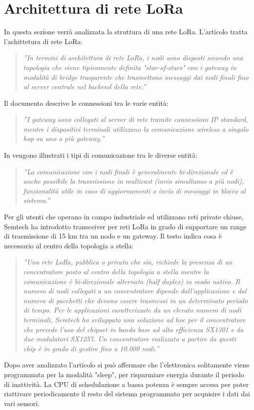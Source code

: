 \documentclass[a4paper]{report} %
\begin{document}
\section{Architettura di rete LoRa}
In questa sezione verrà analizzata la struttura di una rete LoRa. L'articolo \cite{art:rif.27} tratta l'achittetura di rete LoRa:
\begin{quote}
	\textit{''In termini di architettura di rete LoRa, i nodi sono disposti secondo una topologia che viene tipicamente definita "star-of-stars" con i gateway in modalità di bridge trasparente che trasmettono messaggi dai nodi finali fino al server centrale nel backend della rete.''}
\end{quote}
Il documento \cite{art:rif.28} descrive le connessioni tra le varie entità:
\begin{quote}
	\textit{''I gateway sono collegati al server di rete tramite connessioni IP standard, mentre i dispositivi terminali utilizzano la comunicazione wireless a singolo hop su uno o più gateway.''} 
\end{quote}
In \cite{art:rif.27} vengono illustrati i tipi di comunicazione tra le diverse entità: 
\begin{quote}
	\textit{''La comunicazione con i nodi finali è generalmente bi-direzionale ed è anche possibile la trasmissione in multicast (invio simultaneo a più nodi), funzionalità utile in caso di aggiornamenti o invio di messaggi in blocco al sistema.''} 
\end{quote}
Per gli utenti che operano in campo industriale ed utilizzano reti private chiuse, Semtech ha introdotto transceiver per reti LoRa in grado di supportare un range di trasmissione di 15 km tra un nodo e un gateway. Il testo \cite{art:rif.23} indica cosa è necessario al centro della topologia a stella:
\begin{quote}
	\textit{''Una rete LoRa, pubblica o privata che sia, richiede la presenza di un concentratore posto al centro della topologia a stella mentre la comunicazione è bi-direzionale alternata (half duplex) in modo nativo. Il numero di nodi collegati a un concentratore dipende dall'applicazione e dal numero di pacchetti che devono essere trasmessi in un determinato periodo di tempo. Per le applicazioni caratterizzate da un elevato numero di nodi terminali, Semtech ha sviluppato una soluzione ad hoc per il concentratore che prevede l'uso del chipset in banda base ad alta efficienza SX1301 e da due modulatori SX1257. Un concentratore realizzato a partire da questi chip è in grado di gestire fino a 10.000 nodi.''}
\end{quote}
Dopo aver analizzato l'articolo \cite{art:rif.43} si può affermare che l'elettronica solitamente viene programmata per la modalità "sleep", per risparmiare energia durante il periodo di inattività. La CPU di schedulazione a bassa potenza è sempre accesa per poter riattivare periodicamente il resto del sistema programmato per acquisire i dati dai vari sensori. 
\end{document}
